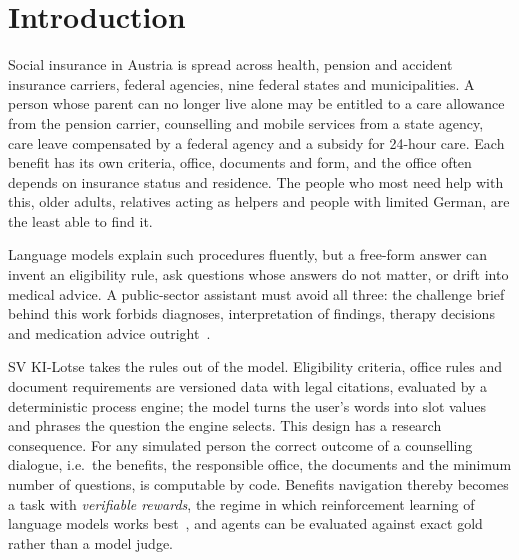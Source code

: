 \documentclass[10pt]{article}
\begin{document}
\section{Introduction}
\label{sec:intro}

Social insurance in Austria is spread across health, pension and accident insurance carriers,
federal agencies, nine federal states and municipalities. A person whose parent can no longer live
alone may be entitled to a care allowance from the pension carrier, counselling and mobile services
from a state agency, care leave compensated by a federal agency and a subsidy for 24-hour care. Each
benefit has its own criteria, office, documents and form, and the office often depends on insurance
status and residence. The people who most need help with this, older adults, relatives acting as
helpers and people with limited German, are the least able to find it.

Language models explain such procedures fluently, but a free-form answer can invent an eligibility
rule, ask questions whose answers do not matter, or drift into medical advice. A public-sector
assistant must avoid all three: the challenge brief behind this work forbids diagnoses,
interpretation of findings, therapy decisions and medication advice outright~\citep{sv-lotse-prd}.

SV KI-Lotse takes the rules out of the model. Eligibility criteria, office rules and document
requirements are versioned data with legal citations, evaluated by a deterministic process engine;
the model turns the user's words into slot values and phrases the question the engine selects. This
design has a research consequence. For any simulated person the correct outcome of a counselling
dialogue, i.e.\ the benefits, the responsible office, the documents and the minimum number of
questions, is computable by code. Benefits navigation thereby becomes a task with \emph{verifiable
rewards}, the regime in which reinforcement learning of language models works
best~\citep{lambert2024tulu3,shao2024deepseekmath}, and agents can be evaluated against exact gold
rather than a model judge.
\end{document}
